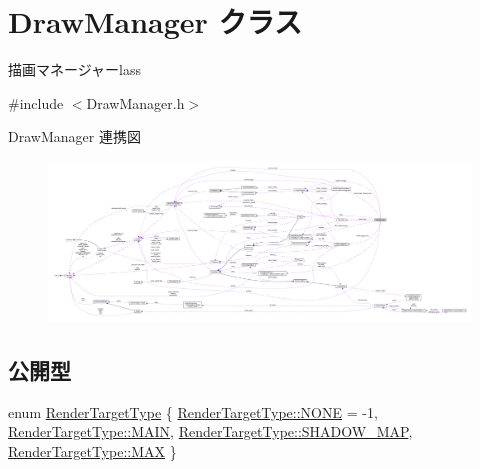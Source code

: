 \hypertarget{class_draw_manager}{}\section{Draw\+Manager クラス}
\label{class_draw_manager}


描画マネージャーlass  




{\ttfamily \#include $<$Draw\+Manager.\+h$>$}



Draw\+Manager 連携図\nopagebreak
\begin{figure}[H]
\begin{center}
\leavevmode
\includegraphics[width=350pt]{class_draw_manager__coll__graph}
\end{center}
\end{figure}
\subsection*{公開型}
\begin{DoxyCompactItemize}
\item 
enum \mbox{\hyperlink{class_draw_manager_a7ade407aee706c02454da2e53a559c9c}{Render\+Target\+Type}} \{ \mbox{\hyperlink{class_draw_manager_a7ade407aee706c02454da2e53a559c9cab50339a10e1de285ac99d4c3990b8693}{Render\+Target\+Type\+::\+N\+O\+NE}} = -\/1, 
\mbox{\hyperlink{class_draw_manager_a7ade407aee706c02454da2e53a559c9ca186495f7da296bf880df3a22a492b378}{Render\+Target\+Type\+::\+M\+A\+IN}}, 
\mbox{\hyperlink{class_draw_manager_a7ade407aee706c02454da2e53a559c9ca5b266596cf5123fb91b9f8fe371dbb03}{Render\+Target\+Type\+::\+S\+H\+A\+D\+O\+W\+\_\+\+M\+AP}}, 
\mbox{\hyperlink{class_draw_manager_a7ade407aee706c02454da2e53a559c9ca26a4b44a837bf97b972628509912b4a5}{Render\+Target\+Type\+::\+M\+AX}}
 \}
\end{DoxyCompactItemize}
